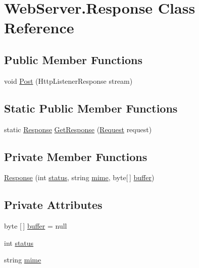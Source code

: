 \hypertarget{class_web_server_1_1_response}{}\section{Web\+Server.\+Response Class Reference}
\label{class_web_server_1_1_response}


 


\subsection*{Public Member Functions}
\begin{DoxyCompactItemize}
\item 
void \hyperlink{class_web_server_1_1_response_ad364efcff262f67707831b940a484a70}{Post} (Http\+Listener\+Response stream)
\end{DoxyCompactItemize}
\subsection*{Static Public Member Functions}
\begin{DoxyCompactItemize}
\item 
static \hyperlink{class_web_server_1_1_response}{Response} \hyperlink{class_web_server_1_1_response_a717abf63a92eb95a56308f017393de17}{Get\+Response} (\hyperlink{class_web_server_1_1_request}{Request} request)
\end{DoxyCompactItemize}
\subsection*{Private Member Functions}
\begin{DoxyCompactItemize}
\item 
\hyperlink{class_web_server_1_1_response_afea2e7fdc234a0ffa1a5e384f0aae4f0}{Response} (int \hyperlink{class_web_server_1_1_response_a132606b61e9c9d01b80114418920c0f7}{status}, string \hyperlink{class_web_server_1_1_response_a12b80a663fee3e25d797abd8bbcbaaef}{mime}, byte\mbox{[}$\,$\mbox{]} \hyperlink{class_web_server_1_1_response_acf5f6489f7a52d8e70a47658f8214d9e}{buffer})
\end{DoxyCompactItemize}
\subsection*{Private Attributes}
\begin{DoxyCompactItemize}
\item 
byte \mbox{[}$\,$\mbox{]} \hyperlink{class_web_server_1_1_response_acf5f6489f7a52d8e70a47658f8214d9e}{buffer} = null
\item 
int \hyperlink{class_web_server_1_1_response_a132606b61e9c9d01b80114418920c0f7}{status}
\item 
string \hyperlink{class_web_server_1_1_response_a12b80a663fee3e25d797abd8bbcbaaef}{mime}
\end{DoxyCompactItemize}


